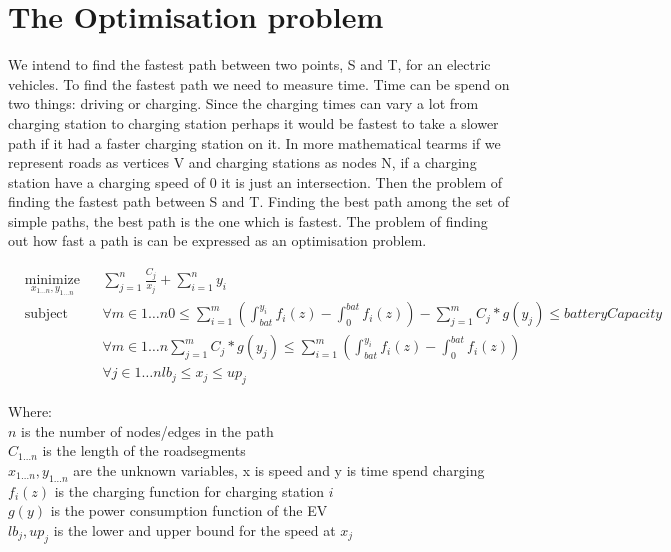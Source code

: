 \section{The Optimisation problem}

We intend to find the fastest path between two points, S and T, for an electric vehicles. To find the fastest path we need to measure time. Time can be spend on two things: driving or charging. Since the charging times can vary a lot from charging station to charging station perhaps it would be fastest to take a slower path if it had a faster charging station on it. In more mathematical tearms if we represent roads as vertices V and charging stations as nodes N, if a charging station have a charging speed of 0 it is just an intersection. Then the problem of finding the fastest path between S and T. Finding the best path among the set of simple paths, the best path is the one which is fastest. The problem of finding out how fast a path is can be expressed as an optimisation problem. 

\begin{equation}
\begin{aligned}
& \underset{x_{1 \dots n},y_{1 \dots n}}{\text{minimize}}
& & \sum_{j=1}^{n} \frac{C_j}{x_j} + \sum_{i=1}^{n} y_i \\
& \text{subject to} 
& & \forall{m \in 1 \dots n} 0 \leq \sum_{i=1}^{m} \left( \int_{bat}^{y_i} f_i(z) - \int_{0}^{bat} f_i(z)\right) - \sum_{j=1}^{m} C_j*g(y_j) \leq batteryCapacity \\
&&& \forall{m \in 1 \dots n} \sum_{j=1}^{m} C_j*g(y_j) \leq \sum_{i=1}^{m} \left( \int_{bat}^{y_i} f_i(z) - \int_{0}^{bat} f_i(z)\right) \\
&&& \forall{j \in 1 \dots n} lb_j \leq x_j \leq up_j
\end{aligned}
\end{equation}\label{eq:optipro}

Where: \\
$n$ is the number of nodes/edges in the path \\
$C_{1 \dots n}$ is the length of the roadsegments \\
$x_{1 \dots n}, y_{1 \dots n}$ are the unknown variables, x is speed and y is time spend charging \\
$f_{i}(z)$ is the charging function for charging station $i$ \\
$g(y)$ is the power consumption function of the EV \\
$lb_j, up_j$ is the lower and upper bound for the speed at $x_j$  \\

